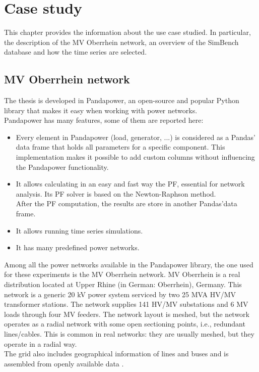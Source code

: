 \chapter{Case study}
\label{ch3}
This chapter provides the information about the use case studied. In particular, the description of the MV Oberrhein network, an overview of the SimBench database and how the time series are selected.


\section{MV Oberrhein network}
\label{sec:3mvon}
The thesis is developed in Pandapower, an open-source and popular Python library that makes it easy when working with power networks. \\
Pandapower has many features, some of them are reported here:
\begin{itemize}
    \item Every element in Pandapower (load, generator, ...) is considered as a Pandas' data frame that holds all parameters for a specific component. This implementation makes it possible to add custom columns without influencing the Pandapower functionality.
    \item It allows calculating in an easy and fast way the \gls{PF}, essential for network analysis. Its \gls{PF} solver is based on the Newton-Raphson method. \\
    After the \gls{PF} computation, the results are store in another Pandas'data frame.
    \item It allows running time series simulations.
    \item It has many predefined power networks.
\end{itemize}
Among all the power networks available in the Pandapower library, the one used for these experiments is the MV Oberrhein network. MV Oberrhein is a real distribution located at Upper Rhine (in German:  Oberrhein),  Germany. This network is a generic 20 kV power system serviced by two 25 MVA HV/MV transformer stations. The network supplies 141 HV/MV substations and 6 MV loads through four MV feeders. The network layout is meshed, but the network operates as a radial network with some open sectioning points, i.e., redundant lines/cables. This is common in real networks: they are usually meshed, but they operate in a radial way.\\
The grid also includes geographical information of lines and buses and is assembled from openly available data \cite{pandapower,mv_ob}.  \\

